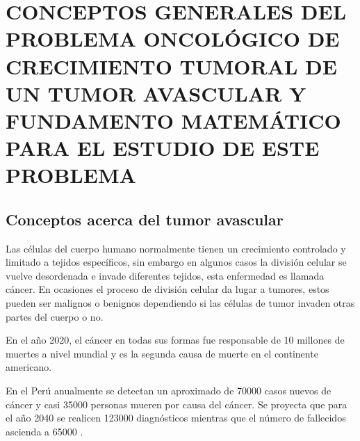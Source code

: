 \chapter{\MakeUppercase{Conceptos generales del problema oncológico de crecimiento tumoral de un tumor avascular y fundamento matemático para el estudio de este problema}}
\thispagestyle{fancy}
\section{Conceptos acerca del tumor avascular}

Las células del cuerpo humano normalmente tienen un  crecimiento controlado y limitado a tejidos específicos, sin embargo en algunos casos la división celular se vuelve desordenada e invade diferentes tejidos, esta enfermedad es llamada cáncer. En ocasiones el proceso de división celular da lugar a tumores, estos pueden ser malignos o benignos dependiendo si las células de tumor invaden otras partes del cuerpo o no.

En el año 2020, el cáncer en todas sus formas fue responsable de 10 millones de muertes a nivel mundial \citep{Revilla2021} y es la segunda causa de muerte en el continente americano.

En el Perú anualmente se detectan un aproximado de 70000 casos nuevos de cáncer y casi 35000 personas mueren por causa del cáncer. Se proyecta que para el año 2040 se realicen 123000 diagnósticos mientras que el número de fallecidos ascienda a 65000 \citep{cancertomorrow}.


%
%
%
%


